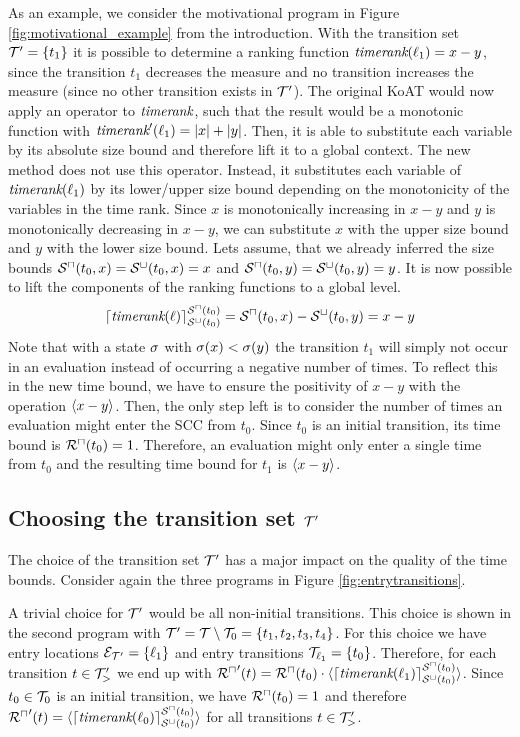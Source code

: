 

As an example, we consider the motivational program in Figure \ref{fig:motivational_example} from the introduction.
With the transition set $\mathcal{T}' = \lbrace t_1 \rbrace$ it is possible to determine a ranking function $\emph{timerank}(\ell_1) = x - y$, since the transition $t_1$ decreases the measure and no transition increases the measure (since no other transition exists in $\mathcal{T}'$).
The original KoAT would now apply an operator to $\emph{timerank}$, such that the result would be a monotonic function with $\emph{timerank}'(\ell_1) = \left|x\right| + \left|y\right|$.
Then, it is able to substitute each variable by its absolute size bound and therefore lift it to a global context.
The new method does not use this operator.
Instead, it substitutes each variable of $\emph{timerank}(\ell_1)$ by its lower/upper size bound depending on the monotonicity of the variables in the time rank.
Since $x$ is monotonically increasing in $x-y$ and $y$ is monotonically decreasing in $x-y$, we can substitute $x$ with the upper size bound and $y$ with the lower size bound.
Lets assume, that we already inferred the size bounds ${\mathcal{S}^\sqcap}(t_0,x) = {\mathcal{S}^\sqcup}(t_0,x) = x$ and ${\mathcal{S}^\sqcap}(t_0,y) = {\mathcal{S}^\sqcup}(t_0,y) = y$.
It is now possible to lift the components of the ranking functions to a global level.
\[ \lceil \emph{timerank}(\ell) \rceil^{{\mathcal{S}^\sqcap}(t_0)}_{{\mathcal{S}^\sqcup}(t_0)} = {\mathcal{S}^\sqcap}(t_0, x) - {\mathcal{S}^\sqcup}(t_0, y) = x - y \]
Note that with a state $\sigma$ with $\sigma(x) < \sigma(y)$ the transition $t_1$ will simply not occur in an evaluation instead of occurring a negative number of times.
To reflect this in the new time bound, we have to ensure the positivity of $x - y$ with the operation $\langle x - y\rangle$.
Then, the only step left is to consider the number of times an evaluation might enter the SCC from $t_0$.
Since $t_0$ is an initial transition, its time bound is ${\mathcal{R}^\sqcap}(t_0) = 1$.
Therefore, an evaluation might only enter a single time from $t_0$ and the resulting time bound for $t_1$ is $\langle x - y\rangle$.

\subsection{Choosing the transition set $\mathcal{T}'$}

The choice of the transition set $\mathcal{T}'$ has a major impact on the quality of the time bounds.
Consider again the three programs in Figure \ref{fig:entrytransitions}.

A trivial choice for $\mathcal{T}'$ would be all non-initial transitions.
This choice is shown in the second program with $\mathcal{T}' = \mathcal{T} \setminus \mathcal{T}_0 = \lbrace t_1, t_2, t_3, t_4 \rbrace$.
For this choice we have entry locations $\mathcal{E}_{\mathcal{T}'} = \lbrace \ell_1 \rbrace$ and entry transitions $\mathcal{T}_{\ell_1} = \lbrace t_0 \rbrace$.
Therefore, for each transition $t \in \mathcal{T}'_>$ we end up with ${\mathcal{R}^\sqcap}'(t) = {\mathcal{R}^\sqcap}(t_0) \cdot \langle\lceil \emph{timerank}(\ell_1) \rceil^{{\mathcal{S}^\sqcap}(t_0)}_{{\mathcal{S}^\sqcup}(t_0)}\rangle$.
Since $t_0 \in \mathcal{T}_0$ is an initial transition, we have ${\mathcal{R}^\sqcap}(t_0) = 1$ and therefore ${\mathcal{R}^\sqcap}'(t) = \langle\lceil \emph{timerank}(\ell_0) \rceil^{{\mathcal{S}^\sqcap}(t_0)}_{{\mathcal{S}^\sqcup}(t_0)}\rangle$ for all transitions $t \in \mathcal{T}'_>$.

